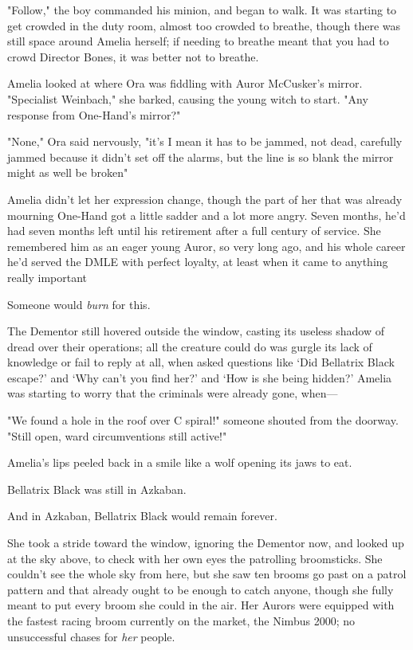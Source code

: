"Follow," the boy commanded his minion, and began to walk.
\sbreak
It was starting to get crowded in the duty room, almost too crowded to breathe,
though there was still space around Amelia herself; if needing to breathe meant
that you had to crowd Director Bones, it was better not to breathe.

Amelia looked at where Ora was fiddling with Auror McCusker's mirror.
"Specialist Weinbach," she barked, causing the young witch to start. "Any
response from One-Hand's mirror?"

"None," Ora said nervously, "it's{\el} I mean it has to be jammed, not dead,
carefully jammed because it didn't set off the alarms, but the line is so blank
the mirror might as well be broken{\el}"

Amelia didn't let her expression change, though the part of her that was
already mourning One-Hand got a little sadder and a lot more angry. Seven
months, he'd had seven months left until his retirement after a full century of
service. She remembered him as an eager young Auror, so very long ago, and his
whole career he'd served the DMLE with perfect loyalty, at least when it came
to anything really important{\el}

Someone would \emph{burn} for this.

The Dementor still hovered outside the window, casting its useless shadow of
dread over their operations; all the creature could do was gurgle its lack of
knowledge or fail to reply at all, when asked questions like `Did Bellatrix
Black escape?' and `Why can't you find her?' and `How is she being hidden?'
Amelia was starting to worry that the criminals were already gone, when—

"We found a hole in the roof over C spiral!" someone shouted from the doorway.
"Still open, ward circumventions still active!"

Amelia's lips peeled back in a smile like a wolf opening its jaws to eat.

Bellatrix Black was still in Azkaban.

And in Azkaban, Bellatrix Black would remain forever.

She took a stride toward the window, ignoring the Dementor now, and looked up
at the sky above, to check with her own eyes the patrolling broomsticks. She
couldn't see the whole sky from here, but she saw ten brooms go past on a
patrol pattern and that already ought to be enough to catch anyone, though she
fully meant to put every broom she could in the air. Her Aurors were equipped
with the fastest racing broom currently on the market, the Nimbus 2000; no
unsuccessful chases for \emph{her} people.

